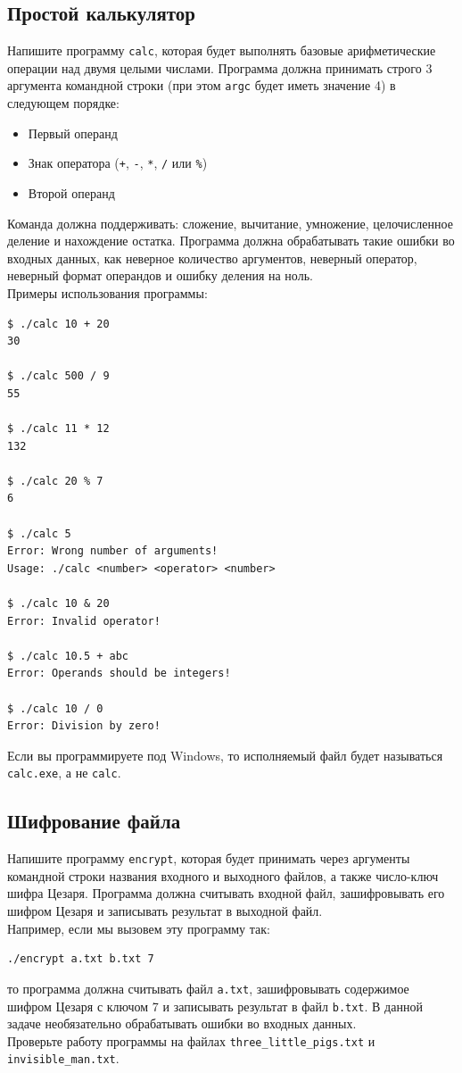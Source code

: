 \documentclass{article}
\begin{document}
\subsection{Простой калькулятор}
Напишите программу \texttt{calc}, которая будет выполнять базовые арифметические операции над двумя целыми числами. Программа должна принимать строго 3 аргумента командной строки (при этом \texttt{argc} будет иметь значение 4) в следующем порядке:
\begin{itemize}
\item Первый операнд
\item Знак оператора (\texttt{+}, \texttt{-}, \texttt{*}, \texttt{/} или \texttt{\%})
\item Второй операнд
\end{itemize}
Команда должна поддерживать: сложение, вычитание, умножение, целочисленное деление и нахождение остатка. Программа должна обрабатывать такие ошибки во входных данных, как неверное количество аргументов, неверный оператор, неверный формат операндов и ошибку деления на ноль. \\
Примеры использования программы:
\begin{lstlisting}
$ ./calc 10 + 20
30

$ ./calc 500 / 9
55

$ ./calc 11 * 12
132

$ ./calc 20 % 7
6

$ ./calc 5
Error: Wrong number of arguments!
Usage: ./calc <number> <operator> <number>

$ ./calc 10 & 20
Error: Invalid operator!

$ ./calc 10.5 + abc
Error: Operands should be integers!

$ ./calc 10 / 0
Error: Division by zero!
\end{lstlisting}
Если вы программируете под Windows, то исполняемый файл будет называться \texttt{calc.exe}, а не \texttt{calc}.


\subsection{Шифрование файла}
Напишите программу \texttt{encrypt}, которая будет принимать через аргументы командной строки названия входного и выходного файлов, а также число-ключ шифра Цезаря. Программа должна считывать входной файл, зашифровывать его шифром Цезаря и записывать результат в выходной файл.\\
Например, если мы вызовем эту программу так:
\begin{verbatim}
./encrypt a.txt b.txt 7
\end{verbatim}
то программа должна считывать файл \texttt{a.txt}, зашифровывать содержимое шифром Цезаря с ключом 7 и записывать результат в файл \texttt{b.txt}. В данной задаче необязательно обрабатывать ошибки во входных данных.\\
Проверьте работу программы на файлах \texttt{three\_little\_pigs.txt} и \texttt{invisible\_man.txt}.
\end{document}
